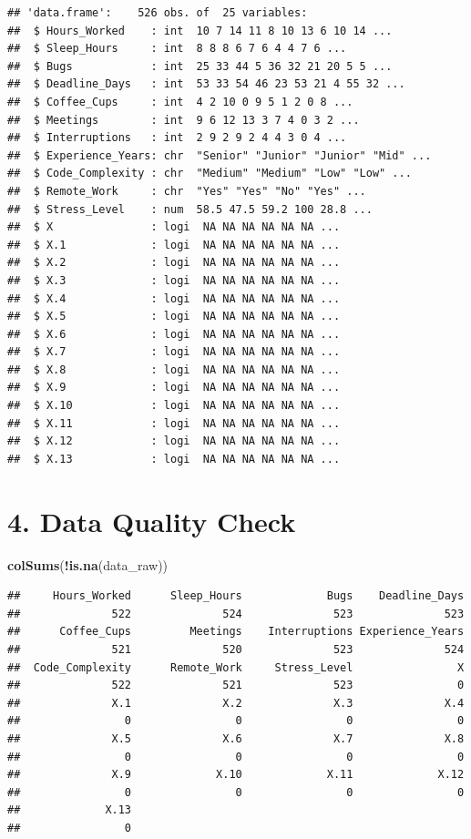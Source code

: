\documentclass[
]{article}
\newenvironment{Shaded}{\begin{snugshade}}{\end{snugshade}}
\newcommand{\FunctionTok}[1]{\textcolor[rgb]{0.13,0.29,0.53}{\textbf{#1}}}
\newcommand{\NormalTok}[1]{#1}
\newcommand{\SpecialCharTok}[1]{\textcolor[rgb]{0.81,0.36,0.00}{\textbf{#1}}}
\begin{document}
\begin{verbatim}
## 'data.frame':    526 obs. of  25 variables:
##  $ Hours_Worked    : int  10 7 14 11 8 10 13 6 10 14 ...
##  $ Sleep_Hours     : int  8 8 8 6 7 6 4 4 7 6 ...
##  $ Bugs            : int  25 33 44 5 36 32 21 20 5 5 ...
##  $ Deadline_Days   : int  53 33 54 46 23 53 21 4 55 32 ...
##  $ Coffee_Cups     : int  4 2 10 0 9 5 1 2 0 8 ...
##  $ Meetings        : int  9 6 12 13 3 7 4 0 3 2 ...
##  $ Interruptions   : int  2 9 2 9 2 4 4 3 0 4 ...
##  $ Experience_Years: chr  "Senior" "Junior" "Junior" "Mid" ...
##  $ Code_Complexity : chr  "Medium" "Medium" "Low" "Low" ...
##  $ Remote_Work     : chr  "Yes" "Yes" "No" "Yes" ...
##  $ Stress_Level    : num  58.5 47.5 59.2 100 28.8 ...
##  $ X               : logi  NA NA NA NA NA NA ...
##  $ X.1             : logi  NA NA NA NA NA NA ...
##  $ X.2             : logi  NA NA NA NA NA NA ...
##  $ X.3             : logi  NA NA NA NA NA NA ...
##  $ X.4             : logi  NA NA NA NA NA NA ...
##  $ X.5             : logi  NA NA NA NA NA NA ...
##  $ X.6             : logi  NA NA NA NA NA NA ...
##  $ X.7             : logi  NA NA NA NA NA NA ...
##  $ X.8             : logi  NA NA NA NA NA NA ...
##  $ X.9             : logi  NA NA NA NA NA NA ...
##  $ X.10            : logi  NA NA NA NA NA NA ...
##  $ X.11            : logi  NA NA NA NA NA NA ...
##  $ X.12            : logi  NA NA NA NA NA NA ...
##  $ X.13            : logi  NA NA NA NA NA NA ...
\end{verbatim}

\section{4. Data Quality Check}\label{data-quality-check}

\begin{Shaded}
\begin{Highlighting}[]
\FunctionTok{colSums}\NormalTok{(}\SpecialCharTok{!}\FunctionTok{is.na}\NormalTok{(data\_raw))}
\end{Highlighting}
\end{Shaded}

\begin{verbatim}
##     Hours_Worked      Sleep_Hours             Bugs    Deadline_Days 
##              522              524              523              523 
##      Coffee_Cups         Meetings    Interruptions Experience_Years 
##              521              520              523              524 
##  Code_Complexity      Remote_Work     Stress_Level                X 
##              522              521              523                0 
##              X.1              X.2              X.3              X.4 
##                0                0                0                0 
##              X.5              X.6              X.7              X.8 
##                0                0                0                0 
##              X.9             X.10             X.11             X.12 
##                0                0                0                0 
##             X.13 
##                0
\end{verbatim}
\end{document}
